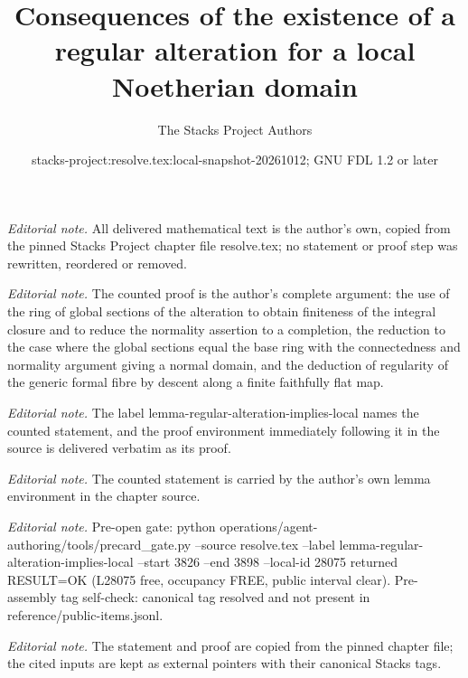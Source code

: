 \documentclass[10pt,a4paper]{amsart}
\title{Consequences of the existence of a regular alteration for a local Noetherian domain}
\author{The Stacks Project Authors}
\date{stacks-project:resolve.tex:local-snapshot-20261012; GNU FDL 1.2 or later}
\theoremstyle{plain}
\theoremstyle{definition}
\theoremstyle{remark}
\numberwithin{equation}{subsection}
\begin{document}
\maketitle
\noindent\textit{Editorial note.} All delivered mathematical text is the author's own, copied from the pinned Stacks Project chapter file resolve.tex; no statement or proof step was rewritten, reordered or removed.\par\medskip
\noindent\textit{Editorial note.} The counted proof is the author's complete argument: the use of the ring of global sections of the alteration to obtain finiteness of the integral closure and to reduce the normality assertion to a completion, the reduction to the case where the global sections equal the base ring with the connectedness and normality argument giving a normal domain, and the deduction of regularity of the generic formal fibre by descent along a finite faithfully flat map.\par\medskip
\noindent\textit{Editorial note.} The label lemma-regular-alteration-implies-local names the counted statement, and the proof environment immediately following it in the source is delivered verbatim as its proof.\par\medskip
\noindent\textit{Editorial note.} The counted statement is carried by the author's own lemma environment in the chapter source.\par\medskip
\noindent\textit{Editorial note.} Pre-open gate: python operations/agent-authoring/tools/precard\_gate.py --source resolve.tex --label lemma-regular-alteration-implies-local --start 3826 --end 3898 --local-id 28075 returned RESULT=OK (L28075 free, occupancy FREE, public interval clear). Pre-assembly tag self-check: canonical tag resolved and not present in reference/public-items.jsonl.\par\medskip
\noindent\textit{Editorial note.} The statement and proof are copied from the pinned chapter file; the cited inputs are kept as external pointers with their canonical Stacks tags.\par\medskip
\end{document}
